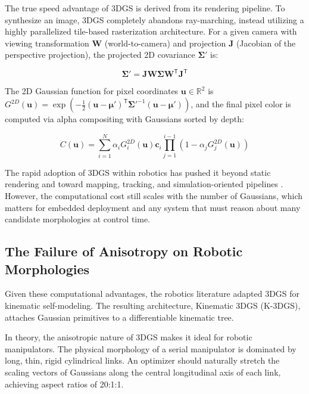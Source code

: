 \documentclass[12pt,a4paper,oneside]{report}
\begin{document}
The true speed advantage of 3DGS is derived from its rendering pipeline. To synthesize an image, 3DGS completely abandons ray-marching, instead utilizing a highly parallelized tile-based rasterization architecture. For a given camera with viewing transformation $\mathbf{W}$ (world-to-camera) and projection $\mathbf{J}$ (Jacobian of the perspective projection), the projected 2D covariance $\boldsymbol{\Sigma}'$ is:

\begin{equation}
\boldsymbol{\Sigma}' = \mathbf{J} \mathbf{W} \boldsymbol{\Sigma} \mathbf{W}^\mathsf{T} \mathbf{J}^\mathsf{T}
\end{equation}

The 2D Gaussian function for pixel coordinates $\mathbf{u} \in \mathbb{R}^2$ is $G^{2D}(\mathbf{u}) = \exp\left(-\frac{1}{2} (\mathbf{u} - \boldsymbol{\mu}')^\mathsf{T} \boldsymbol{\Sigma}'^{-1} (\mathbf{u} - \boldsymbol{\mu}')\right)$, and the final pixel color is computed via alpha compositing with Gaussians sorted by depth:

\begin{equation}
C(\mathbf{u}) = \sum_{i=1}^{N} \alpha_i G_i^{2D}(\mathbf{u}) \mathbf{c}_i \prod_{j=1}^{i-1} (1 - \alpha_j G_j^{2D}(\mathbf{u}))
\end{equation}

The rapid adoption of 3DGS within robotics has pushed it beyond static rendering and toward mapping, tracking, and simulation-oriented pipelines \cite{matsuki2024gaussian, keetha2024splattam, guedon2024sugar, lassanske2024gaurast}. However, the computational cost still scales with the number of Gaussians, which matters for embedded deployment and any system that must reason about many candidate morphologies at control time.

\subsection{The Failure of Anisotropy on Robotic Morphologies}

Given these computational advantages, the robotics literature adapted 3DGS for kinematic self-modeling. The resulting architecture, Kinematic 3DGS (K-3DGS), attaches Gaussian primitives to a differentiable kinematic tree.

In theory, the anisotropic nature of 3DGS makes it ideal for robotic manipulators. The physical morphology of a serial manipulator is dominated by long, thin, rigid cylindrical links. An optimizer should naturally stretch the scaling vectors of Gaussians along the central longitudinal axis of each link, achieving aspect ratios of 20:1:1.
\end{document}
